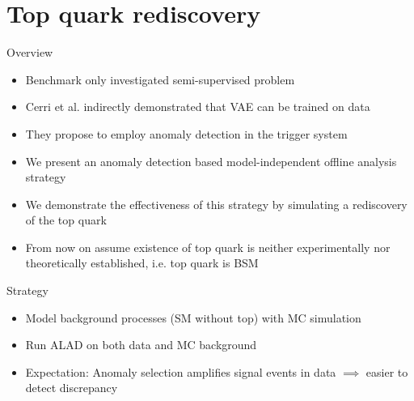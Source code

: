 \documentclass{beamer}
\begin{document}
\section{Top quark rediscovery}
\begin{frame}{Overview}
  \begin{itemize}
      \item<1-> Benchmark only investigated semi-supervised problem
      \item<2-> Cerri et al. indirectly demonstrated that VAE can be trained on data
      \item<3-> They propose to employ anomaly detection in the trigger system
      \item<4-> We present an anomaly detection based model-independent offline analysis strategy
      \item<5-> We demonstrate the effectiveness of this strategy by simulating a rediscovery of the top quark
      \item<6-> From now on assume existence of top quark is neither experimentally nor theoretically established, i.e. top quark is BSM
  \end{itemize}
\end{frame}

\begin{frame}{Strategy}
  \begin{itemize}
      \item<1-> Model background processes (SM without top) with MC simulation
      \item<2-> Run ALAD on both data and MC background
      \item<3-> Expectation: Anomaly selection amplifies signal events in data $\implies$ easier to detect discrepancy
  \end{itemize}
\end{frame}
\end{document}
